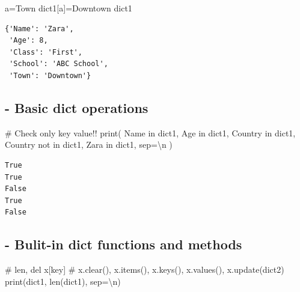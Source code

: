 \documentclass[
  a4paper,
  DIV=11,
  numbers=noendperiod]{scrreprt}
\newenvironment{Shaded}{\begin{snugshade}}{\end{snugshade}}
\newcommand{\BuiltInTok}[1]{\textcolor[rgb]{0.00,0.23,0.31}{#1}}
\newcommand{\CharTok}[1]{\textcolor[rgb]{0.13,0.47,0.30}{#1}}
\newcommand{\CommentTok}[1]{\textcolor[rgb]{0.37,0.37,0.37}{#1}}
\newcommand{\KeywordTok}[1]{\textcolor[rgb]{0.00,0.23,0.31}{#1}}
\newcommand{\NormalTok}[1]{\textcolor[rgb]{0.00,0.23,0.31}{#1}}
\newcommand{\OperatorTok}[1]{\textcolor[rgb]{0.37,0.37,0.37}{#1}}
\newcommand{\StringTok}[1]{\textcolor[rgb]{0.13,0.47,0.30}{#1}}
\begin{document}
\begin{Shaded}
\begin{Highlighting}[]
\NormalTok{a}\OperatorTok{=}\StringTok{\textquotesingle{}Town\textquotesingle{}}
\NormalTok{dict1[a]}\OperatorTok{=}\StringTok{\textquotesingle{}Downtown\textquotesingle{}}
\NormalTok{dict1}
\end{Highlighting}
\end{Shaded}

\begin{verbatim}
{'Name': 'Zara',
 'Age': 8,
 'Class': 'First',
 'School': 'ABC School',
 'Town': 'Downtown'}
\end{verbatim}

\subsection{- Basic dict operations}\label{basic-dict-operations}

\begin{Shaded}
\begin{Highlighting}[]
\CommentTok{\# Check only key value!!}
\BuiltInTok{print}\NormalTok{(}
    \StringTok{\textquotesingle{}Name\textquotesingle{}} \KeywordTok{in}\NormalTok{ dict1,}
    \StringTok{\textquotesingle{}Age\textquotesingle{}} \KeywordTok{in}\NormalTok{ dict1,}
    \StringTok{\textquotesingle{}Country\textquotesingle{}} \KeywordTok{in}\NormalTok{ dict1,}
    \StringTok{\textquotesingle{}Country\textquotesingle{}} \KeywordTok{not} \KeywordTok{in}\NormalTok{ dict1,}
    \StringTok{\textquotesingle{}Zara\textquotesingle{}} \KeywordTok{in}\NormalTok{ dict1,}
\NormalTok{    sep}\OperatorTok{=}\StringTok{\textquotesingle{}}\CharTok{\textbackslash{}n}\StringTok{\textquotesingle{}}
\NormalTok{)}
\end{Highlighting}
\end{Shaded}

\begin{verbatim}
True
True
False
True
False
\end{verbatim}

\subsection{- Bulit-in dict functions and
methods}\label{bulit-in-dict-functions-and-methods}

\begin{Shaded}
\begin{Highlighting}[]
\CommentTok{\# len, del x[key]}
\CommentTok{\# x.clear(), x.items(), x.keys(), x.values(), x.update(dict2)}
\BuiltInTok{print}\NormalTok{(dict1, }\BuiltInTok{len}\NormalTok{(dict1), sep}\OperatorTok{=}\StringTok{\textquotesingle{}}\CharTok{\textbackslash{}n}\StringTok{\textquotesingle{}}\NormalTok{)}
\end{Highlighting}
\end{Shaded}
\end{document}
